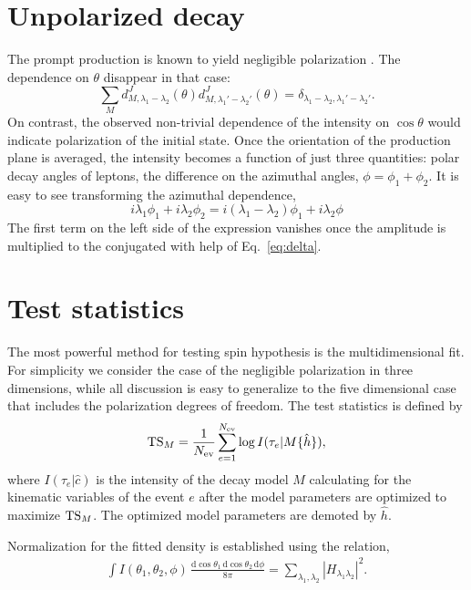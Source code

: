 \documentclass[prd,preprintnumbers,floatfix,
nofootinbib,superscriptaddress]{revtex4}
\newcommand{\diff}{\mathrm{d}}
\begin{document}
\section{Unpolarized decay}
The prompt production is known to yield negligible polarization \cite{Lambda@ATLAS, Charmoniub, Lambdab}. The dependence on $\theta$ disappear in that case:
\begin{equation} \label{eq:delta}
  \sum_M d_{M,\lambda_1-\lambda_2}^{J}(\theta) d_{M,\lambda_1'-\lambda_2'}^{J}(\theta) = \delta_{\lambda_1-\lambda_2,\lambda_1'-\lambda_2'}.
\end{equation}
On contrast, the observed non-trivial dependence of the intensity on $\cos\theta$
would indicate polarization of the initial state.
Once the orientation of the production plane is averaged, the intensity becomes a function of just three quantities: polar decay angles of leptons, the difference on the azimuthal angles, $\phi = \phi_1+\phi_2$. It is easy to see transforming the azimuthal dependence,
\begin{equation}
i\lambda_1\phi_1+i\lambda_2\phi_2 = i(\lambda_1-\lambda_2)\phi_1+i\lambda_2\phi
\end{equation}
The first term on the left side of the expression vanishes once the amplitude is multiplied
to the conjugated with help of Eq.~\eqref{eq:delta}.

\section{Test statistics}
The most powerful method for testing spin hypothesis is the multidimensional fit.
For simplicity we consider the case of the negligible polarization in three dimensions, while all discussion is easy to generalize to the five dimensional case that includes
the polarization degrees of freedom.
The test statistics is defined by
\begin{equation}
  \mathrm{TS}_M = \frac{1}{N_\mathrm{ev}} \sum_{e=1}^{N_\mathrm{ev}} \log I(\tau_e|M\{\hat{h}\}),
\end{equation}
where $I(\tau_e|\hat{c})$ is the intensity of the decay model $M$ calculating for the kinematic variables of the event $e$ after the model parameters are optimized to maximize $\mathrm{TS}_M$.
The optimized model parameters are demoted by $\hat{h}$.

Normalization for the fitted density is established using the relation,
\begin{align}
  \int I(\theta_1,\theta_2,\phi)\,\frac{\diff\cos\theta_1\,\diff\cos\theta_2\,\diff \phi}{8\pi} = \sum_{\lambda_1,\lambda_2} |H_{\lambda_1\lambda_2}|^2.
\end{align}
\end{document}
